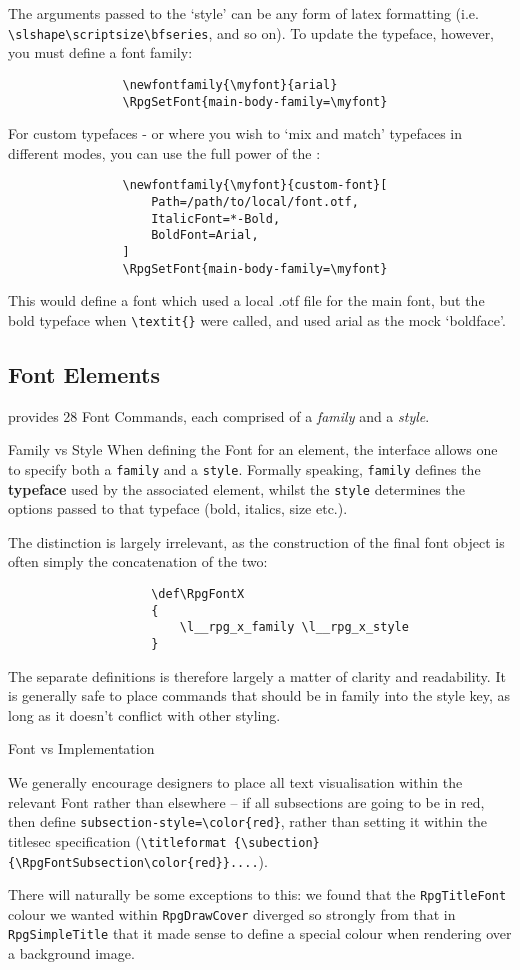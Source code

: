 			The arguments passed to the `style' can be any form of latex formatting (i.e. \verb|\slshape\scriptsize\bfseries|, and so on). To update the typeface, however, you must define a font family:
			\begin{lstlisting}
				\newfontfamily{\myfont}{arial}
				\RpgSetFont{main-body-family=\myfont}
			\end{lstlisting}

			For custom typefaces - or where you wish to `mix and match' typefaces in different modes, you can use the full power of the :
			\begin{lstlisting}
				\newfontfamily{\myfont}{custom-font}[
					Path=/path/to/local/font.otf,
					ItalicFont=*-Bold,
					BoldFont=Arial,
				]
				\RpgSetFont{main-body-family=\myfont}
			\end{lstlisting}
			This would define a font which used a local .otf file for the main font, but the bold typeface when \verb|\textit{}| were called, and used arial as the mock `boldface'.

		\subsection{Font Elements}
			\rpgtex{} provides 28 Font Commands, each comprised of a \textit{family} and a \textit{style}. 
			\begin{RpgSidebar}{Family vs Style}
				When defining the Font for an element, the interface allows one to specify both a \texttt{family} and a \texttt{style}. Formally speaking, \texttt{family} defines the \textbf{typeface} used by the associated element, whilst the \texttt{style} determines the options passed to that typeface (bold, italics, size etc.).

				The distinction is largely irrelevant, as the construction of the final font object is often simply the concatenation of the two:
				\begin{lstlisting}
					\def\RpgFontX
					{
						\l__rpg_x_family \l__rpg_x_style
					}
				\end{lstlisting}
				The separate definitions is therefore largely a matter of clarity and readability. It is generally safe to place commands that should be in family into the style key, as long as it doesn't conflict with other styling.
				
				\vspace{1em}
				{\RpgFontSidebarTitle \noindent Font vs Implementation}

				We generally encourage designers to place all text visualisation within the relevant Font rather than elsewhere -- if all subsections are going to be in red, then define \verb|subsection-style=\color{red}|, rather than setting it within the titlesec specification (\verb|\titleformat {\subection}{\RpgFontSubsection\color{red}}....|).

				There will naturally be some exceptions to this: we found that the \verb|RpgTitleFont| colour we wanted within \verb|RpgDrawCover| diverged so strongly from that in \verb|RpgSimpleTitle| that it made sense to define a special colour when rendering over a background image.
			\end{RpgSidebar}

